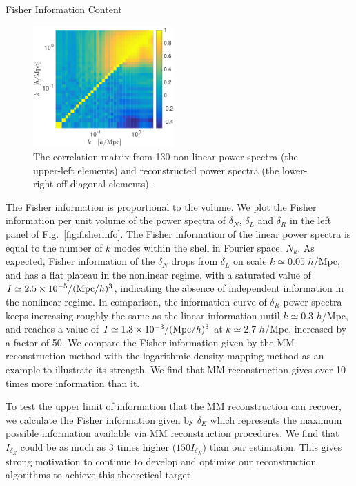 \begin{section}{Fisher Information Content}
  \begin{figure}
    \centering
    \includegraphics[width=0.48\textwidth]{fig3.pdf}
    \caption{The correlation matrix from 130 non-linear power
      spectra (the upper-left elements) and reconstructed power
      spectra (the lower-right off-diagonal elements).}
    \label{fig:corrall}
  \end{figure}

  The Fisher information is proportional to the volume. 
  We plot the Fisher information per unit volume of the power spectra of
  $\delta_N$, $\delta_L$ and $\delta_R$ in the left panel of 
  Fig.~\ref{fig:fisherinfo}. The Fisher information of the linear 
  power spectra is equal to the number of $k$ modes within the shell in 
  Fourier space, $N_k$. As expected, Fisher information of the
  $\delta_N$ drops from $\delta_L$ on scale
  $k \simeq 0.05$ $h$/Mpc, and has a flat plateau in the nonlinear
  regime, with a saturated value of
  $I \simeq 2.5 \times 10^{-5}/({\rm Mpc}/h)^3$, indicating
  the absence of independent information in the nonlinear
  regime.  In comparison, the information curve of $\delta_R$ power
  spectra keeps increasing roughly the same as the linear information
  until $k\simeq 0.3$ $h$/Mpc, and reaches a value of 
  $I \simeq 1.3 \times 10^{-3}/({\rm Mpc}/h)^3$ at $k \simeq 2.7$ $h$/Mpc,
  increased by a factor of 50.
  We compare the Fisher information given by the MM reconstruction method
  with the logarithmic density mapping method \cite{bib:Mark2009} as
  an example to illustrate its strength. We find that MM
  reconstruction gives over 10 times more information than it.
  
  To test the upper limit of information that the MM reconstruction can recover, 
  we calculate the Fisher information given by $\delta_E$ \cite{bib:Yu2016} 
  which represents the maximum possible information available via MM reconstruction procedures.
  We find that $I_{\delta_E}$ could be as much as 3 times higher ($150 I_{\delta_N}$) than our estimation.
  This gives strong motivation to continue to develop and optimize our 
  reconstruction algorithms to achieve this theoretical target.


\end{section}
